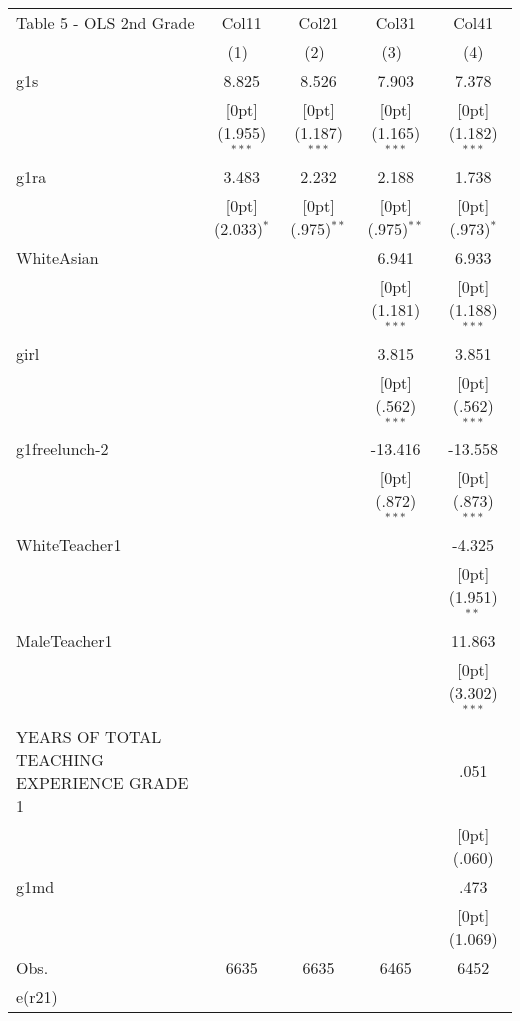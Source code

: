 \documentclass[a4paper,11pt]{article}
\begin{document}
\begin{table}
	\small
		\begin{tabular*}{\textwidth}{@{\extracolsep{\fill}}lcccc}				
			Table 5 - OLS 2nd Grade & \multicolumn{1}{c}{Col11} &	\multicolumn{1}{c}{Col21} &	\multicolumn{1}{c}{Col31} &	\multicolumn{1}{c}{Col41} \\
			\cline{2-5}				
			& \multicolumn{1}{c}{(1)\mbox{\ }} &	\multicolumn{1}{c}{(2)\mbox{\ }} &	\multicolumn{1}{c}{(3)\mbox{\ }} &	\multicolumn{1}{c}{(4)} \\
			\hline				
			g1s &	8.825 &	8.526 &	7.903 &	7.378 \\
			&	\raisebox{.7ex}[0pt]{\scriptsize (1.955)$^{***}$} &	\raisebox{.7ex}[0pt]{\scriptsize (1.187)$^{***}$} &	\raisebox{.7ex}[0pt]{\scriptsize (1.165)$^{***}$} &	\raisebox{.7ex}[0pt]{\scriptsize (1.182)$^{***}$} \\
			g1ra &	3.483 &	2.232 &	2.188 &	1.738 \\
			&	\raisebox{.7ex}[0pt]{\scriptsize (2.033)$^{*}$} &	\raisebox{.7ex}[0pt]{\scriptsize (.975)$^{**}$} &	\raisebox{.7ex}[0pt]{\scriptsize (.975)$^{**}$} &	\raisebox{.7ex}[0pt]{\scriptsize (.973)$^{*}$} \\
			WhiteAsian &	&	&	6.941 &	6.933 \\
			&	&	&	\raisebox{.7ex}[0pt]{\scriptsize (1.181)$^{***}$} &	\raisebox{.7ex}[0pt]{\scriptsize (1.188)$^{***}$} \\
			girl &	&	&	3.815 &	3.851 \\
			&	&	&	\raisebox{.7ex}[0pt]{\scriptsize (.562)$^{***}$} &	\raisebox{.7ex}[0pt]{\scriptsize (.562)$^{***}$} \\
			g1freelunch-2 &	&	&	-13.416 &	-13.558 \\
			&	&	&	\raisebox{.7ex}[0pt]{\scriptsize (.872)$^{***}$} &	\raisebox{.7ex}[0pt]{\scriptsize (.873)$^{***}$} \\
			WhiteTeacher1 &	&	&	&	-4.325 \\
			&	&	&	&	\raisebox{.7ex}[0pt]{\scriptsize (1.951)$^{**}$} \\
			MaleTeacher1 &	&	&	&	11.863 \\
			&	&	&	&	\raisebox{.7ex}[0pt]{\scriptsize (3.302)$^{***}$} \\
			YEARS OF TOTAL TEACHING EXPERIENCE GRADE 1 &	&	&	&	.051 \\
			&	&	&	&	\raisebox{.7ex}[0pt]{\scriptsize (.060)} \\
			g1md &	&	&	&	.473 \\
			&	&	&	&	\raisebox{.7ex}[0pt]{\scriptsize (1.069)} \\
			Obs. &	6635 &	6635 &	6465 &	6452 \\
			e(r21) &	&	&	&	\\
	\hline\hline				
\end{tabular*}
\end{table}	
\end{document}
